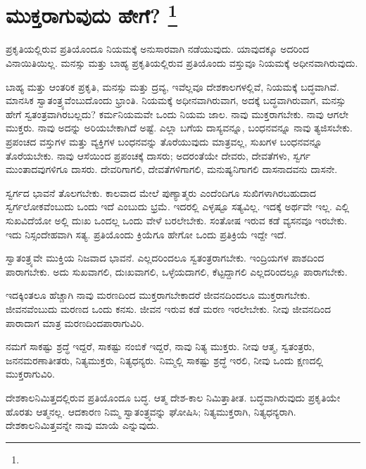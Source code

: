 
\vspace{-0.6cm}

\chapter[ಮುಕ್ತರಾಗುವುದು ಹೇಗೆ? ]{ಮುಕ್ತರಾಗುವುದು ಹೇಗೆ? \protect\footnote{}}

ಪ್ರಕೃತಿಯಲ್ಲಿರುವ ಪ್ರತಿಯೊಂದೂ ನಿಯಮಕ್ಕೆ ಅನುಸಾರವಾಗಿ ನಡೆಯುವುದು. ಯಾವುದಕ್ಕೂ ಅದರಿಂದ ವಿನಾಯಿತಿಯಿಲ್ಲ. ಮನಸ್ಸು ಮತ್ತು ಬಾಹ್ಯ ಪ್ರಕೃತಿಯಲ್ಲಿರುವ ಪ್ರತಿಯೊಂದು ವಸ್ತುವೂ ನಿಯಮಕ್ಕೆ ಅಧೀನವಾಗಿರುವುದು.

\eject

ಬಾಹ್ಯ ಮತ್ತು ಆಂತರಿಕ ಪ್ರಕೃತಿ, ಮನಸ್ಸು ಮತ್ತು ದ್ರವ್ಯ, ಇವೆಲ್ಲವೂ ದೇಶ\break ಕಾಲಗಳಲ್ಲಿವೆ, ನಿಯಮಕ್ಕೆ ಬದ್ಧವಾಗಿವೆ. ಮಾನಸಿಕ ಸ್ವಾತಂತ್ರ್ಯವೆಂಬುದೊಂದು ಭ್ರಾಂತಿ. ನಿಯಮಕ್ಕೆ ಅಧೀನವಾಗಿರುವಾಗ, ಅದಕ್ಕೆ ಬದ್ಧವಾಗಿರುವಾಗ, ಮನಸ್ಸು ಹೇಗೆ ಸ್ವತಂತ್ರವಾಗಿರಬಲ್ಲದು? ಕರ್ಮನಿಯಮವೇ ಒಂದು ನಿಯಮ ಜಾಲ. ನಾವು ಮುಕ್ತರಾಗಬೇಕು. ನಾವು ಆಗಲೇ ಮುಕ್ತರು. ನಾವು ಅದನ್ನು ಅರಿಯಬೇಕಾಗಿದೆ ಅಷ್ಟೆ. ಎಲ್ಲಾ ಬಗೆಯ ದಾಸ್ಯವನ್ನೂ, ಬಂಧನವನ್ನೂ ನಾವು ತ್ಯಜಿಸಬೇಕು. ಪ್ರಪಂಚದ ವಸ್ತುಗಳ ಮತ್ತು ವ್ಯಕ್ತಿಗಳ ಬಂಧನವನ್ನು ತೊರೆಯುವುದು ಮಾತ್ರವಲ್ಲ, ಸುಖಗಳ ಬಂಧನವನ್ನೂ ತೊರೆಯಬೇಕು. ನಾವು ಆಸೆಯಿಂದ ಪ್ರಪಂಚಕ್ಕೆ ದಾಸರು; ಅದರಂತೆಯೇ ದೇವರು, ದೇವತೆಗಳು, ಸ್ವರ್ಗ ಮುಂತಾದವುಗಳಿಗೂ ದಾಸರು. ದೇವರಿಗಾಗಲಿ, ದೇವತೆಗಳಿಗಾಗಲಿ, ಮನುಷ್ಯನಿಗಾಗಲಿ ದಾಸನಾದವನು ದಾಸನೇ.

\vskip 0.1cm

ಸ್ವರ್ಗದ ಭಾವನೆ ತೊಲಗಬೇಕು. ಕಾಲವಾದ ಮೇಲೆ ಪುಣ್ಯಾತ್ಮರು ಎಂದೆಂದಿಗೂ ಸುಖಿಗಳಾಗಿರಬಹುದಾದ ಸ್ವರ್ಗಲೋಕವೆಂಬುದು ಒಂದು ಇದೆ ಎಂಬುದು ಭ್ರಮೆ. ಇದರಲ್ಲಿ ಎಳ್ಳಷ್ಟೂ ಸತ್ಯವಿಲ್ಲ. ಇದಕ್ಕೆ ಅರ್ಥವೇ ಇಲ್ಲ. ಎಲ್ಲಿ ಸುಖವಿದೆಯೋ ಅಲ್ಲಿ ದುಃಖ ಒಂದಲ್ಲ ಒಂದು ವೇಳೆ ಬರಲೇಬೇಕು. ಸಂತೋಷ ಇರುವ ಕಡೆ ವ್ಯಸನವೂ ಇರಬೇಕು. ಇದು ನಿಸ್ಸಂದೇಹವಾಗಿ ಸತ್ಯ. ಪ್ರತಿಯೊಂದು ಕ್ರಿಯೆಗೂ ಹೇಗೋ ಒಂದು ಪ್ರತಿಕ್ರಿಯೆ ಇದ್ದೇ ಇದೆ.

\vskip 0.1cm

ಸ್ವಾತಂತ್ರ್ಯವೇ ಮುಕ್ತಿಯ ನಿಜವಾದ ಭಾವನೆ. ಎಲ್ಲದರಿಂದಲೂ ಸ್ವತಂತ್ರರಾಗಬೇಕು. ಇಂದ್ರಿಯಗಳ ಪಾಶದಿಂದ ಪಾರಾಗಬೇಕು. ಅದು ಸುಖವಾಗಲಿ, ದುಃಖವಾಗಲಿ, ಒಳ್ಳೆಯದಾಗಲಿ, ಕೆಟ್ಟದ್ದಾಗಲಿ ಎಲ್ಲದರಿಂದಲ್ಲೂ ಪಾರಾಗಬೇಕು.

\vskip 0.1cm

ಇದಕ್ಕಿಂತಲೂ ಹೆಚ್ಚಾಗಿ ನಾವು ಮರಣದಿಂದ ಮುಕ್ತರಾಗಬೇಕಾದರೆ ಜೀವನದಿಂದಲೂ ಮುಕ್ತರಾಗಬೇಕು. ಜೀವನವೆಂಬುದು ಮರಣದ ಒಂದು ಕನಸು. ಜೀವನ ಇರುವ ಕಡೆ ಮರಣ ಇರಲೇಬೇಕು. ನೀವು ಜೀವನದಿಂದ ಪಾರಾದಾಗ ಮಾತ್ರ ಮರಣದಿಂದ\break ಪಾರಾಗುವಿರಿ.

\vskip 0.1cm

ನಮಗೆ ಸಾಕಷ್ಟು ಶ್ರದ್ಧೆ ಇದ್ದರೆ, ಸಾಕಷ್ಟು ನಂಬಿಕೆ ಇದ್ದರೆ, ನಾವು ನಿತ್ಯ ಮುಕ್ತರು. ನೀವು ಆತ್ಮ, ಸ್ವತಂತ್ರರು, ಜನನಮರಣಾತೀತರು, ನಿತ್ಯಮುಕ್ತರು, ನಿತ್ಯಧನ್ಯರು. ನಿಮ್ಮಲ್ಲಿ ಸಾಕಷ್ಟು ಶ್ರದ್ಧೆ ಇರಲಿ, ನೀವು ಒಂದು ಕ್ಷಣದಲ್ಲಿ ಮುಕ್ತರಾಗುವಿರಿ.

\vskip 0.1cm

ದೇಶಕಾಲನಿಮಿತ್ತದಲ್ಲಿರುವ ಪ್ರತಿಯೊಂದೂ ಬದ್ಧ. ಆತ್ಮ ದೇಶ-ಕಾಲ ನಿಮಿತ್ತಾತೀತ. ಬದ್ಧವಾಗಿರುವುದು ಪ್ರಕೃತಿಯೇ ಹೊರತು ಆತ್ಮನಲ್ಲ. ಆದಕಾರಣ ನಿಮ್ಮ ಸ್ವಾತಂತ್ರ್ಯವನ್ನು ಘೋಷಿಸಿ; ನಿತ್ಯಮುಕ್ತರಾಗಿ, ನಿತ್ಯಧನ್ಯರಾಗಿ. ದೇಶಕಾಲನಿಮಿತ್ತವನ್ನೇ ನಾವು ಮಾಯೆ ಎನ್ನುವುದು.

